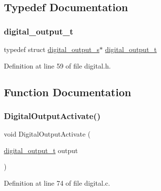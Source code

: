 \subsection{Typedef Documentation}
\mbox{\label{group___plantilla_ga3e63b19d3d0dbfbfb2c50b3ac1f69aa0}} 
\subsubsection{\texorpdfstring{digital\+\_\+output\+\_\+t}{digital\_output\_t}}
{\footnotesize\ttfamily typedef struct \hyperlink{structdigital__output__s}{digital\+\_\+output\+\_\+s}$\ast$ \hyperlink{group___plantilla_ga3e63b19d3d0dbfbfb2c50b3ac1f69aa0}{digital\+\_\+output\+\_\+t}}



Definition at line 59 of file digital.\+h.



\subsection{Function Documentation}
\mbox{\label{group___plantilla_ga1f511c067eceef7bc5ccddfda3255b9b}} 
\subsubsection{\texorpdfstring{Digital\+Output\+Activate()}{DigitalOutputActivate()}}
{\footnotesize\ttfamily void Digital\+Output\+Activate (\begin{DoxyParamCaption}\item[{\hyperlink{group___plantilla_ga3e63b19d3d0dbfbfb2c50b3ac1f69aa0}{digital\+\_\+output\+\_\+t}}]{output }\end{DoxyParamCaption})}



Definition at line 74 of file digital.\+c.

\mbox{\label{group___plantilla_ga99386f34f6a3040267ecb98215761571}} 
